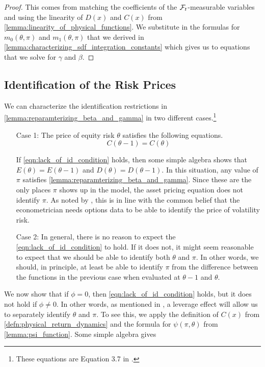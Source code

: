 \documentclass[11pt, letterpaper, twoside]{article}
\begin{document}
\begin{proof}
 This comes from matching the coefficients of the $\mathcal{F}_t$-measurable variables and using the linearity of $D(x)$
 and $C(x)$ from \cref{lemma:linearity_of_physical_functions}. 
 We substitute in the formulas for $m_0(\theta, \pi)$ and $m_1(\theta, \pi)$ that we derived in
 \cref{lemma:characterizing_sdf_integration_constants} which gives us to equations that we solve for $\gamma$
 and $\beta$.

\end{proof}
 
\subsection{Identification of the Risk Prices}

We can characterize the identification restrictions in \cref{lemma:reparamterizing_beta_and_gamma} in two
different cases.\footnote{These equations are Equation 3.7 in
\textcite{han2018leverage}.}

\begin{enumerate}
 \item[Case 1:] The price of equity risk $\theta$ satisfies the following equations. 
  \begin{equation}
   C(\theta - 1) = C(\theta) 
   \label{eqn:lack_of_id_condition}
  \end{equation}

  If \cref{eqn:lack_of_id_condition} holds, then some simple algebra shows that $E(\theta) = E(\theta-1)$
  and $D(\theta) = D(\theta-1)$.
  In this situation, any value of $\pi$ satisfies \cref{lemma:reparamterizing_beta_and_gamma}. 
  Since these are the only places $\pi$ shows up in the model, the asset pricing equation does not identify
  $\pi$. 
  As noted by \textcite{han2018leverage}, this is in line with the common belief that the econometrician
  needs options data to be able to identify the price of volatility risk. 

 \item[Case 2:] 
  In general, there is no reason to expect the \cref{eqn:lack_of_id_condition} to hold.
  If it does not, it might seem reasonable to expect that we should be able to identify both $\theta$ and
  $\pi$.
  In other words, we should, in principle, at least be able to identify $\pi$ from the difference between the
  functions in the previous case when evaluated at $\theta-1$ and $\theta$.
\end{enumerate}

We now show that if $\phi = 0$, then \cref{eqn:lack_of_id_condition} holds, but it does not hold if $\phi \neq 0$. In other words, as mentioned in \textcite[13]{han2018leverage}, a leverage effect will allow us to separately identify $\theta$ and $\pi$. To see this, we apply the definition of $C(x)$ from \cref{defn:physical_return_dynamics} and the formula for $\psi(\pi, \theta)$ from \cref{lemma:psi_function}. Some simple algebra gives 
\end{document}
